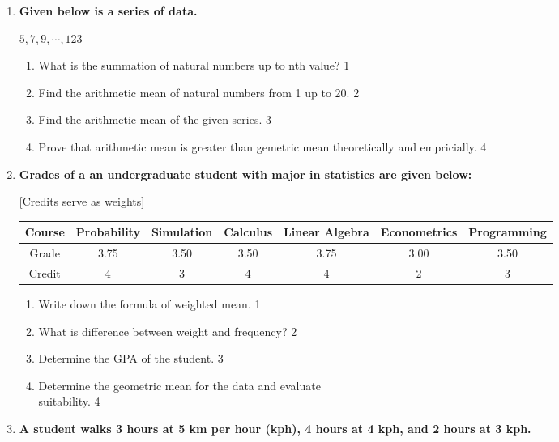 \documentclass[a4paper,oneside]{book}
\begin{document}
\begin{enumerate}
   \item
	  \textbf{Given below is a series of data.} 
	  
	  	    \begin{center}
	 $5, 7, 9, \cdots , 123$
	    \end{center}
  
  \begin{enumerate}
    \item
	What is the summation of natural numbers up to nth value? \hfill 1
    \item
	Find the arithmetic mean of natural numbers from 1 up to 20. \hfill 2
    \item  
	Find the arithmetic mean of the given series. \hfill 3
    \item
	Prove that arithmetic mean is greater than gemetric mean theoretically and empricially. \hfill 4
  \end{enumerate}
  
   \item
	  \textbf{Grades of a an undergraduate student with major in statistics are given below: } 
	  
	  [Credits serve as weights]

\begin{table}[h]
\centering
\begin{tabular}{c|c|c|c|c|c|c}
\hline
Course & Probability & Simulation & Calculus & Linear Algebra & Econometrics & Programming \\ \hline
Grade & 3.75 & 3.50 & 3.50 & 3.75 & 3.00 & 3.50 \\  \hline
Credit & 4 & 3 & 4 & 4 & 2 & 3 \\ \hline
\end{tabular}
\end{table}


  
  \begin{enumerate}
    \item
	Write down the formula of weighted mean. \hfill 1
    \item
	What is difference between weight and frequency? \hfill 2
    \item  
	Determine the GPA of the student. \hfill 3
    \item
	Determine the geometric mean for the data and evaluate \\ suitability. \hfill 4
  \end{enumerate}

 \item
	  \textbf{A student walks 3 hours at 5 km per hour (kph), 4 hours at 4 kph, and 2 hours at 3 kph.} 
  

\end{enumerate}
\end{document}
